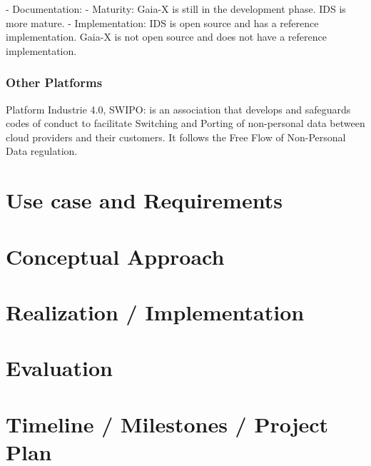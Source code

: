 \documentclass{article}
\begin{document}
- Documentation: 
- Maturity: Gaia-X is still in the development phase. IDS is more mature.
- Implementation: IDS is open source and has a reference implementation. Gaia-X is not open source and does not have a reference implementation.



\subsubsection*{Other Platforms}
Platform Industrie 4.0, 
SWIPO: is an association that develops and safeguards codes of conduct to facilitate Switching and Porting of non-personal data between cloud providers and their customers.
It follows the Free Flow of Non-Personal Data regulation.

\section{Use case and Requirements} %

\section{Conceptual Approach} %

\section{Realization / Implementation} %


\section{Evaluation} %

\section{Timeline / Milestones / Project Plan} %

 

\end{document}
